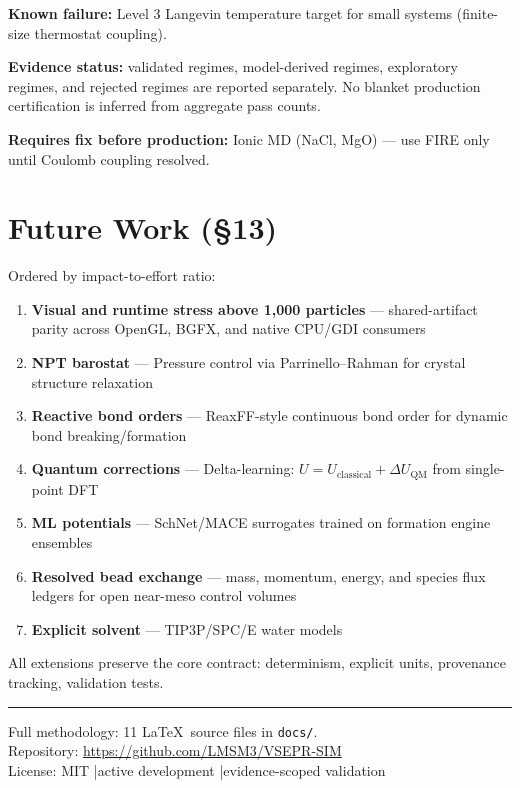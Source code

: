 \documentclass[11pt, a4paper]{article}
\begin{document}
\textbf{Known failure:} Level 3 Langevin temperature target for small systems (finite-size thermostat coupling).

\textbf{Evidence status:} validated regimes, model-derived regimes, exploratory regimes, and rejected regimes are reported separately. No blanket production certification is inferred from aggregate pass counts.

\textbf{Requires fix before production:} Ionic MD (NaCl, MgO) --- use FIRE only until Coulomb coupling resolved.


\section{Future Work (\S13)}

Ordered by impact-to-effort ratio:

\begin{enumerate}
\item \textbf{Visual and runtime stress above 1,000 particles} --- shared-artifact parity across OpenGL, BGFX, and native CPU/GDI consumers
\item \textbf{NPT barostat} --- Pressure control via Parrinello--Rahman for crystal structure relaxation
\item \textbf{Reactive bond orders} --- ReaxFF-style continuous bond order for dynamic bond breaking/formation
\item \textbf{Quantum corrections} --- Delta-learning: $U = U_\text{classical} + \Delta U_\text{QM}$ from single-point DFT
\item \textbf{ML potentials} --- SchNet/MACE surrogates trained on formation engine ensembles
\item \textbf{Resolved bead exchange} --- mass, momentum, energy, and species flux ledgers for open near-meso control volumes
\item \textbf{Explicit solvent} --- TIP3P/SPC/E water models
\end{enumerate}

All extensions preserve the core contract: determinism, explicit units, provenance tracking, validation tests.

\vspace{1em}\hrule\vspace{0.5em}

\begin{center}
\small
Full methodology: 11 \LaTeX\ source files in \texttt{docs/}.\\
Repository: \url{https://github.com/LMSM3/VSEPR-SIM}\\
License: MIT \quad|\quad active development \quad|\quad evidence-scoped validation
\end{center}
\end{document}
